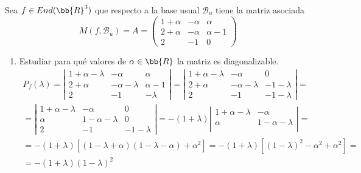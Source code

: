 \begin{ejercicio}
    Sea $f\in End(\bb{R}^3)$ que respecto a la base usual $\mathcal{B}_u$ tiene la matriz asociada
    \begin{equation*}
        M(f, \mathcal{B}_u) = A = \left(\begin{array}{ccc}
            1+\alpha & -\alpha & \alpha \\
            2+\alpha & -\alpha & \alpha-1 \\
            2 & -1 & 0
        \end{array} \right)
    \end{equation*}
    \begin{enumerate}
        \item Estudiar para qué valores de $\alpha \in \bb{R}$ la matriz es diagonalizable.
        \begin{multline*}
            P_f(\lambda) = \left|\begin{array}{ccc}
            1+\alpha-\lambda & -\alpha & \alpha \\
            2+\alpha & -\alpha-\lambda & \alpha-1 \\
            2 & -1 & -\lambda
        \end{array} \right| =
        \left|\begin{array}{ccc}
            1+\alpha-\lambda & -\alpha & 0 \\
            2+\alpha & -\alpha-\lambda & -1-\lambda \\
            2 & -1 & -1-\lambda
        \end{array} \right| = \\ =
        \left|\begin{array}{ccc}
            1+\alpha-\lambda & -\alpha & 0 \\
            \alpha & 1-\alpha-\lambda & 0 \\
            2 & -1 & -1-\lambda
        \end{array} \right|
        = -(1+\lambda)\left|\begin{array}{cc}
            1+\alpha-\lambda & -\alpha\\
            \alpha & 1-\alpha-\lambda\\
        \end{array} \right| = \\ = -(1+\lambda)\left[ (1-\lambda+\alpha)(1-\lambda-\alpha)+\alpha^2 \right]
        = -(1+\lambda)\left[ (1-\lambda)^2 - \alpha^2 +\alpha^2 \right] = \\=
        -(1+\lambda)(1-\lambda)^2
        \end{multline*}


\end{enumerate}
\end{ejercicio}
